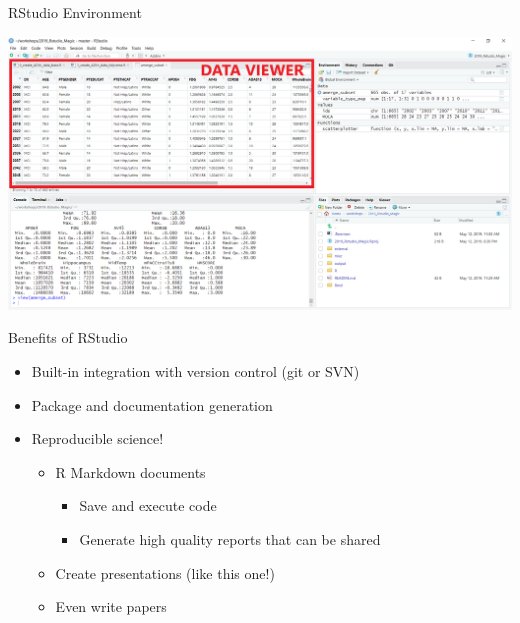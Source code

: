 \documentclass[
  ignorenonframetext,
]{beamer}
\providecommand{\tightlist}{%
  \setlength{\itemsep}{0pt}\setlength{\parskip}{0pt}}
\begin{document}
\begin{frame}{RStudio Environment}
\protect\hypertarget{rstudio-environment-4}{}

\includegraphics{../external/images/rstudio_terminal_5_DATA.png}

\end{frame}

\begin{frame}{Benefits of RStudio}
\protect\hypertarget{benefits-of-rstudio}{}

\begin{itemize}[<+->]
\tightlist
\item
  Built-in integration with version control (git or SVN)
\item
  Package and documentation generation
\item
  Reproducible science!

  \begin{itemize}[<+->]
  \tightlist
  \item
    R Markdown documents

    \begin{itemize}[<+->]
    \tightlist
    \item
      Save and execute code
    \item
      Generate high quality reports that can be shared
    \end{itemize}
  \item
    Create presentations (like this one!)
  \item
    Even write papers
  \end{itemize}
\end{itemize}

\end{frame}
\end{document}
